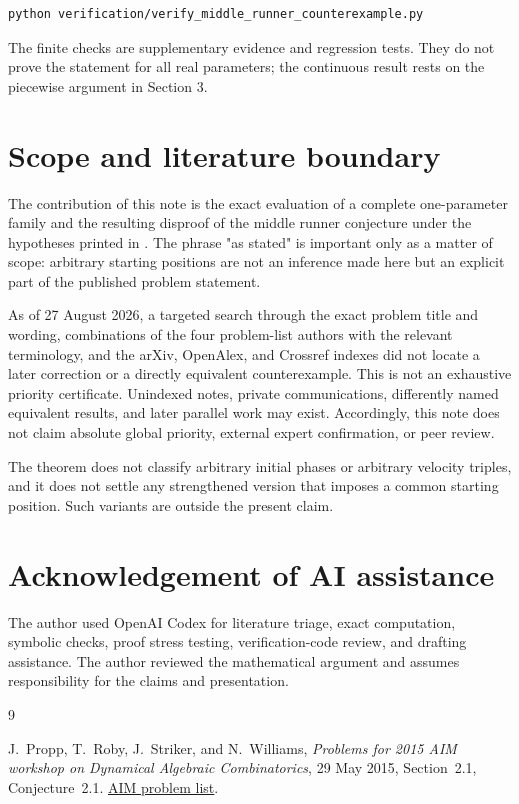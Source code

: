 \documentclass[11pt]{article}
\numberwithin{equation}{section}
\begin{document}
\begin{verbatim}
python verification/verify_middle_runner_counterexample.py
\end{verbatim}


The finite checks are supplementary evidence and regression tests. They do
not prove the statement for all real parameters; the continuous result rests
on the piecewise argument in Section 3.

\section{Scope and literature boundary}


The contribution of this note is the exact evaluation of a complete
one-parameter family and the resulting disproof of the middle runner
conjecture under the hypotheses printed in \cite{aim2015}. The phrase "as stated" is
important only as a matter of scope: arbitrary starting positions are not an
inference made here but an explicit part of the published problem statement.

As of 27 August 2026, a targeted search through the exact problem title and wording, combinations
of the four problem-list authors with the relevant terminology, and the
arXiv, OpenAlex, and Crossref indexes did not locate a later correction or a
directly equivalent counterexample. This is not an exhaustive priority
certificate. Unindexed notes, private communications, differently named
equivalent results, and later parallel work may exist. Accordingly, this note
does not claim absolute global priority, external expert confirmation, or
peer review.

The theorem does not classify arbitrary initial phases or arbitrary velocity
triples, and it does not settle any strengthened version that imposes a
common starting position. Such variants are outside the present claim.

\section*{Acknowledgement of AI assistance}


The author used OpenAI Codex for literature triage, exact computation,
symbolic checks, proof stress testing, verification-code review, and drafting
assistance. The author reviewed the mathematical argument and assumes
responsibility for the claims and presentation.

\begin{thebibliography}{9}
\footnotesize
\raggedright

J.~Propp, T.~Roby, J.~Striker, and N.~Williams,
\emph{Problems for 2015 AIM workshop on Dynamical Algebraic Combinatorics},
29 May 2015, Section~2.1, Conjecture~2.1.
\href{https://aimath.org/pastworkshops/dac_preworkshop.pdf}{AIM problem list}.

\end{thebibliography}
\end{document}
